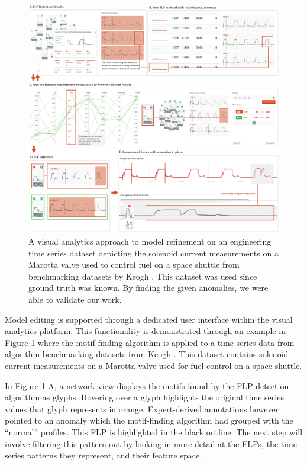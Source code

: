 \begin{figure}[ht!]
\centering
\includegraphics[width=\textwidth]{images/timeseries/results}
\caption{A visual analytics approach to model refinement on an engineering time series dataset depicting the solenoid current measurements on a Marotta valve used to control fuel on a space shuttle from benchmarking datasets by Keogh \etal \cite{shuttle_data}. This dataset was used since ground truth was known. By finding the given anomalies, we were able to validate our work.}
\label{fig:results}
\end{figure}
%

Model editing is supported through a dedicated user interface within the visual analytics platform. 
This functionality is demonstrated through an example in Figure \ref{fig:results} where the motif-finding algorithm is applied to a time-series data from algorithm benchmarking datasets from Keogh \etal \cite{shuttle_data}. 
This dataset contains solenoid current measurements on a Marotta valve used for fuel control on a space shuttle.

In Figure \ref{fig:results} A, a network view displays the motifs found by the FLP detection algorithm as glyphs. 
Hovering over a glyph highlights the original time series values that glyph represents in orange. 
Expert-derived annotations however pointed to an anomaly which the motif-finding algorithm had grouped with the ``normal''  profiles. 
This FLP is highlighted in the black outline. 
The next step will involve filtering this pattern out by looking in more detail at the FLPs, the time series patterns they represent, and their feature space. 

